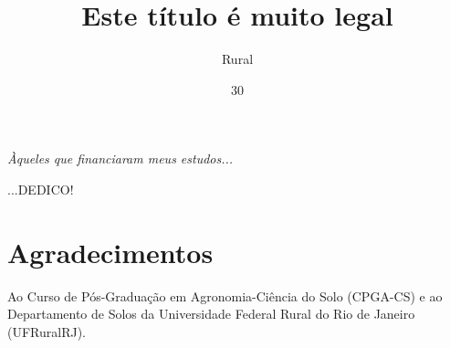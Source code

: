 \documentclass[tese]{UFRuralRJ}
\title{Este título é muito legal}                              %
\author{Rural}{Nome do Melhor Estudante da}                    %
\institute{Instituto da Agronomia}                             %
\date{30}{Fevereiro}{2016}                                             %
\begin{document}
\maketitle


\makeapprove


\clearpage\mbox{}\vfill\hspace{80mm}
\begin{minipage}{76mm}
  \begin{flushright}
    {\em
    Àqueles que financiaram meus estudos...
    \par
    ...DEDICO!
    }
  \end{flushright}
\end{minipage}


\chapter*{Agradecimentos}

Ao Curso de Pós-Graduação em Agronomia-Ciência do Solo (CPGA-CS) e ao 
Departamento de Solos da Universidade Federal Rural do Rio de Janeiro 
(UFRuralRJ).
\end{document}
